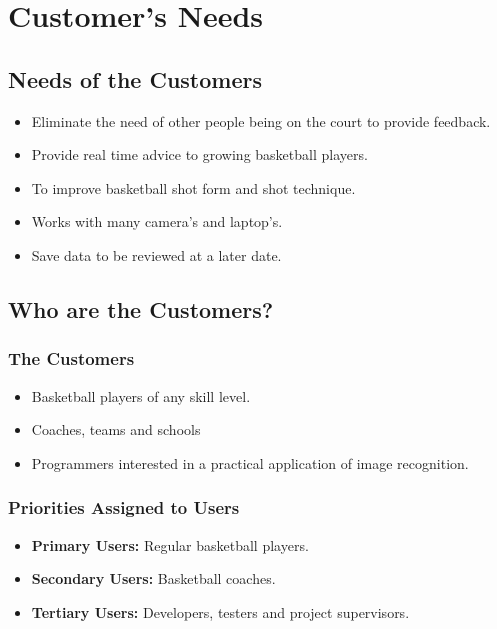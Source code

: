 \chapter{Customer's Needs}

\section{Needs of the Customers}
\begin{itemize}
    \item Eliminate the need of other people being on the court to provide feedback.
    \item Provide real time advice to growing basketball players.
    \item To improve basketball shot form and shot technique.
    \item Works with many camera's and laptop's.
    \item Save data to be reviewed at a later date.
\end{itemize}

\section{Who are the Customers?}

\subsection{The Customers}
\begin{itemize}
    \item Basketball players of any skill level.
    \item Coaches, teams and schools
    \item Programmers interested in a practical application of image recognition.
\end{itemize}

\subsection{Priorities Assigned to Users}
\begin{itemize}
    \item \textbf{Primary Users:} Regular basketball players.
    \item \textbf{Secondary Users:} Basketball coaches.
    \item \textbf{ Tertiary Users:} Developers, testers and project supervisors.
\end{itemize}

